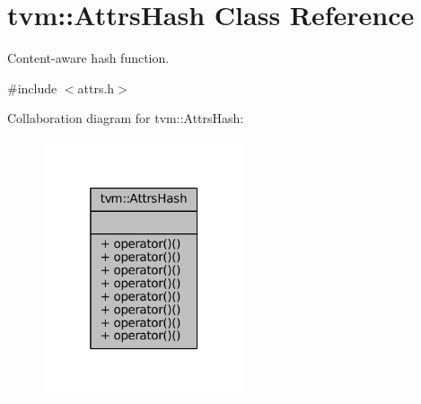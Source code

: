 \hypertarget{classtvm_1_1AttrsHash}{}\section{tvm\+:\+:Attrs\+Hash Class Reference}
\label{classtvm_1_1AttrsHash}


Content-\/aware hash function.  




{\ttfamily \#include $<$attrs.\+h$>$}



Collaboration diagram for tvm\+:\+:Attrs\+Hash\+:
\nopagebreak
\begin{figure}[H]
\begin{center}
\leavevmode
\includegraphics[width=169pt]{classtvm_1_1AttrsHash__coll__graph}
\end{center}
\end{figure}
